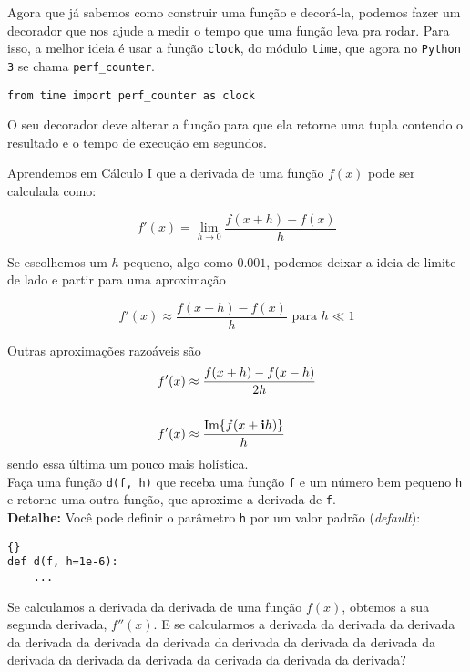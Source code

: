 \documentclass[12pt]{article}
\begin{document}
	
	Agora que já sabemos como construir uma função e decorá-la, podemos fazer um decorador que nos ajude a medir o tempo que uma função leva pra rodar. Para isso, a melhor ideia é usar a função \texttt{clock}, do módulo \texttt{time}, que agora no \texttt{Python 3} se chama \texttt{perf\_{}counter}.
	
	\begin{lstlisting}
from time import perf_counter as clock
	\end{lstlisting}
	
	\quest O seu decorador deve alterar a função para que ela retorne uma tupla contendo o resultado e o tempo de execução em segundos.
	
	
	Aprendemos em Cálculo I que a derivada de uma função $f(x)$ pode ser calculada como:
	
		$$f'(x) = \lim_{h \to 0} \frac{f(x + h) - f(x)}{h}$$
	
	Se escolhemos um $h$ pequeno, algo como $0.001$, podemos deixar a ideia de limite de lado e partir para uma aproximação
	
		$$f'(x) \approx \frac{f(x + h) - f(x)}{h} \text{ para } h \ll 1$$

	Outras aproximações razoáveis são	
		\begin{align*}
		f'(x) &\approx \frac{f(x + h) - f(x - h)}{2h}\\
		\\		
		f'(x) &\approx \frac{ \text{Im}\{f(x + \mathbf{i}h)\} }{h} 
		\end{align*}	
	sendo essa última um pouco mais holística.\\
	
	\quest Faça uma função \texttt{d(f, h)} que receba uma função \texttt{f} e um número bem pequeno \texttt{h} e retorne uma outra função, que aproxime a derivada de \texttt{f}.\\
	
	\textbf{Detalhe:} Você pode definir o parâmetro \texttt{h} por um valor padrão (\textit{default}):
	
	\begin{lstlisting}{}
def d(f, h=1e-6):
	...
	\end{lstlisting}
	
	
	Se calculamos a derivada da derivada de uma função $f(x)$, obtemos a sua segunda derivada, $f''(x)$. E se calcularmos a derivada da derivada da derivada da derivada da derivada da derivada da derivada da derivada da derivada da derivada da derivada da derivada da derivada da derivada da derivada?\\
	
\end{document}
